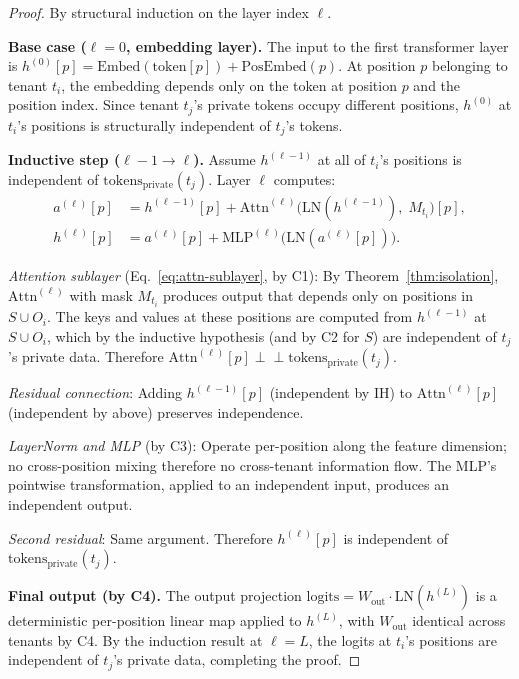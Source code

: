\documentclass[11pt]{article}
\begin{document}
\begin{proof}
By structural induction on the layer index $\ell$.

\medskip\noindent
\textbf{Base case ($\ell = 0$, embedding layer).}
The input to the first transformer layer is
$h^{(0)}[p] = \mathrm{Embed}(\mathrm{token}[p]) + \mathrm{PosEmbed}(p)$.
At position $p$ belonging to tenant $t_i$, the embedding depends only on
the token at position $p$ and the position index.  Since tenant $t_j$'s
private tokens occupy different positions, $h^{(0)}$ at $t_i$'s positions
is structurally independent of $t_j$'s tokens.

\medskip\noindent
\textbf{Inductive step ($\ell - 1 \to \ell$).}
Assume $h^{(\ell-1)}$ at all of $t_i$'s positions is independent of
$\mathrm{tokens}_{\mathrm{private}}(t_j)$.  Layer $\ell$ computes:
\begin{align}
    a^{(\ell)}[p] &= h^{(\ell-1)}[p] + \mathrm{Attn}^{(\ell)}\!\big(\mathrm{LN}(h^{(\ell-1)}),\; M_{t_i}\big)[p], \label{eq:attn-sublayer}\\
    h^{(\ell)}[p] &= a^{(\ell)}[p] + \mathrm{MLP}^{(\ell)}\!\big(\mathrm{LN}(a^{(\ell)}[p])\big). \label{eq:mlp-sublayer}
\end{align}

\noindent\emph{Attention sublayer} (Eq.~\ref{eq:attn-sublayer}, by C1):
By Theorem~\ref{thm:isolation}, $\mathrm{Attn}^{(\ell)}$ with mask $M_{t_i}$
produces output that depends only on positions in $S \cup O_i$.  The keys
and values at these positions are computed from $h^{(\ell-1)}$ at
$S \cup O_i$, which by the inductive hypothesis (and by C2 for $S$) are
independent of $t_j$'s private data.  Therefore
$\mathrm{Attn}^{(\ell)}[p] \perp\!\!\!\perp \mathrm{tokens}_{\mathrm{private}}(t_j)$.

\noindent\emph{Residual connection}: Adding $h^{(\ell-1)}[p]$ (independent
by IH) to $\mathrm{Attn}^{(\ell)}[p]$ (independent by above) preserves
independence.

\noindent\emph{LayerNorm and MLP} (by C3): Operate per-position along the
feature dimension; no cross-position mixing therefore no cross-tenant
information flow.  The MLP's pointwise transformation, applied to an
independent input, produces an independent output.

\noindent\emph{Second residual}: Same argument.  Therefore $h^{(\ell)}[p]$
is independent of $\mathrm{tokens}_{\mathrm{private}}(t_j)$.

\medskip\noindent
\textbf{Final output (by C4).}
The output projection
$\mathrm{logits} = W_{\mathrm{out}} \cdot \mathrm{LN}(h^{(L)})$
is a deterministic per-position linear map applied to $h^{(L)}$, with
$W_{\mathrm{out}}$ identical across tenants by C4.  By the induction
result at $\ell = L$, the logits at $t_i$'s positions are independent of
$t_j$'s private data, completing the proof.
\end{proof}
\end{document}
